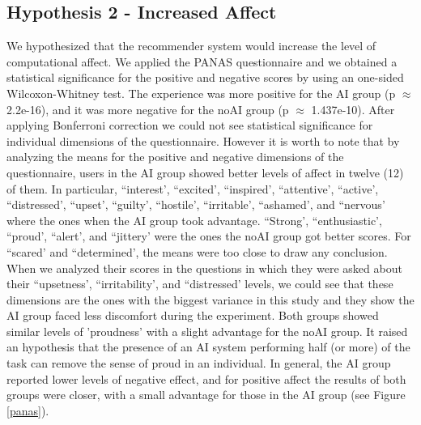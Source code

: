 \documentclass[letterpaper]{article} %
\begin{document}
\subsection{Hypothesis 2 - Increased Affect}
We hypothesized that the recommender system would increase the level of computational affect. We applied the PANAS questionnaire and we obtained a statistical significance for the positive and negative scores by using an one-sided Wilcoxon-Whitney test. The experience was more positive for the AI group (p $\approx$ 2.2e-16), and it was more negative for the noAI group (p $\approx$ 1.437e-10). After applying Bonferroni correction we could not see statistical significance for individual dimensions of the questionnaire. However it is worth to note that by analyzing the means for the positive and negative dimensions of the questionnaire, users in the AI group showed better levels of affect in twelve (12) of them. In particular, ``interest', ``excited', ``inspired', ``attentive', ``active', ``distressed', ``upset', ``guilty', ``hostile', ``irritable', ``ashamed', and ``nervous' where the ones when the AI group took advantage. ``Strong', ``enthusiastic', ``proud', ``alert', and ``jittery' were the ones the noAI group got better scores. For ``scared' and ``determined', the means were too close to draw any conclusion. When we analyzed their scores in the questions in which they were asked about their ``upsetness', ``irritability', and ``distressed' levels, we could see that these dimensions are the ones with the biggest variance in this study and they show the AI group faced less discomfort during the experiment. Both groups showed similar levels of 'proudness' with a slight advantage for the noAI group. It raised an hypothesis that the presence of an AI system performing half (or more) of the task can remove the sense of proud in an individual. In general, the AI group reported lower levels of negative effect, and for positive affect the results of both groups were closer, with a small advantage for those in the AI group (see Figure \ref{panas}).
\end{document}
